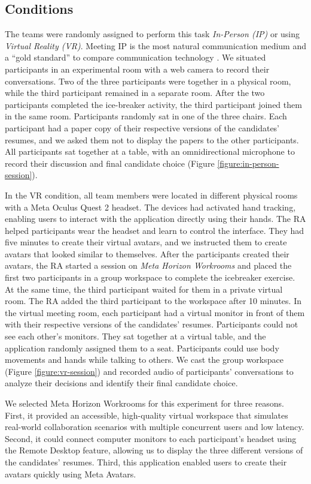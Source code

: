 \subsection{Conditions}
The teams were randomly assigned to perform this task \textit{In-Person (IP)} or using \textit{Virtual Reality (VR)}. Meeting IP is the most natural communication medium and a ``gold standard'' to compare communication technology \cite{harrison2020framing}. We situated participants in an experimental room with a web camera to record their conversations. Two of the three participants were together in a physical room, while the third participant remained in a separate room. After the two participants completed the ice-breaker activity, the third participant joined them in the same room. Participants randomly sat in one of the three chairs. Each participant had a paper copy of their respective versions of the candidates' resumes, and we asked them not to display the papers to the other participants. All participants sat together at a table, with an omnidirectional microphone to record their discussion and final candidate choice (Figure \ref{figure:in-person-session}).

In the VR condition, all team members were located in different physical rooms with a Meta Oculus Quest 2 headset. The devices had activated hand tracking, enabling users to interact with the application directly using their hands. The RA helped participants wear the headset and learn to control the interface. They had five minutes to create their virtual avatars, and we instructed them to create avatars that looked similar to themselves. After the participants created their avatars, the RA started a session on \textit{Meta Horizon Workrooms} and placed the first two participants in a group workspace to complete the icebreaker exercise. At the same time, the third participant waited for them in a private virtual room. The RA added the third participant to the workspace after 10 minutes. In the virtual meeting room, each participant had a virtual monitor in front of them with their respective versions of the candidates' resumes. Participants could not see each other's monitors. They sat together at a virtual table, and the application randomly assigned them to a seat. Participants could use body movements and hands while talking to others. We cast the group workspace (Figure \ref{figure:vr-session}) and recorded audio of participants' conversations to analyze their decisions and identify their final candidate choice. 

We selected Meta Horizon Workrooms for this experiment for three reasons. First, it provided an accessible, high-quality virtual workspace that simulates real-world collaboration scenarios with multiple concurrent users and low latency. Second, it could connect computer monitors to each participant's headset using the Remote Desktop feature, allowing us to display the three different versions of the candidates' resumes. Third, this application enabled users to create their avatars quickly using Meta Avatars.   

